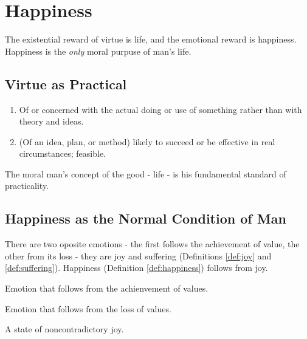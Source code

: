 \chapter{Happiness}

    The existential reward of virtue is life, and the emotional reward is happiness. Happiness is the \textit{only} moral purpuse of man's life.

    \section{Virtue as Practical}

        \begin{definition}[Practical]
        \label{def:practical}
            \begin{enumerate}
                \item Of or concerned with the actual doing or use of something rather than with theory and ideas.
                \item (Of an idea, plan, or method) likely to succeed or be effective in real circumstances; feasible.
            \end{enumerate}
        \end{definition}

        The moral man's concept of the good - life - is his fundamental standard of practicality.

    \section{Happiness as the Normal Condition of Man}

        There are two oposite emotions - the first follows the achievement of value, the other from its loss - they are joy and suffering (Definitions \ref{def:joy} and \ref{def:suffering}). Happiness (Definition \ref{def:happiness}) follows from joy.

        \begin{definition}[Joy]
        \label{def:joy}
            Emotion that follows from the achienvement of values.
        \end{definition}

        \begin{definition}[Suffering]
        \label{def:suffering}
            Emotion that follows from the loss of values.
        \end{definition}

        \begin{definition}[Happiness]
        \label{def:happiness}
            A state of noncontradictory joy.
        \end{definition}

